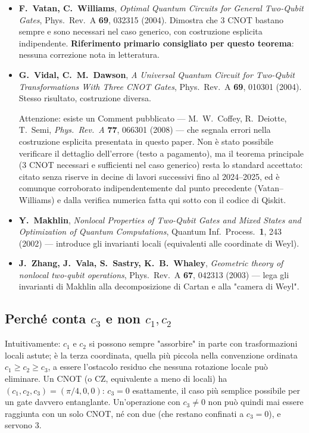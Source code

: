 \documentclass[11pt,a4paper]{article}
\begin{document}
\begin{itemize}[leftmargin=1.3em,itemsep=0.4em]
\item \textbf{F.\ Vatan, C.\ Williams}, \emph{Optimal Quantum Circuits
for General Two-Qubit Gates}, Phys.\ Rev.\ A \textbf{69}, 032315
(2004). Dimostra che 3 CNOT bastano sempre e sono necessari nel caso
generico, con costruzione esplicita indipendente. \textbf{Riferimento
primario consigliato per questo teorema}: nessuna correzione nota in
letteratura.
\item \textbf{G.\ Vidal, C.\ M.\ Dawson}, \emph{A Universal Quantum
Circuit for Two-Qubit Transformations With Three CNOT Gates}, Phys.\
Rev.\ A \textbf{69}, 010301 (2004). Stesso risultato, costruzione
diversa.
\begin{editnote}
Attenzione: esiste un Comment pubblicato --- M.\ W.\ Coffey, R.\
Deiotte, T.\ Semi, \emph{Phys.\ Rev.\ A} \textbf{77}, 066301 (2008) ---
che segnala errori nella costruzione esplicita presentata in questo
paper. Non è stato possibile verificare il dettaglio dell'errore
(testo a pagamento), ma il teorema principale (3 CNOT necessari e
sufficienti nel caso generico) resta lo standard accettato: citato
senza riserve in decine di lavori successivi fino al 2024--2025, ed è
comunque corroborato indipendentemente dal punto precedente
(Vatan--Williams) e dalla verifica numerica fatta qui sotto con il
codice di Qiskit.
\end{editnote}
\item \textbf{Y.\ Makhlin}, \emph{Nonlocal Properties of Two-Qubit
Gates and Mixed States and Optimization of Quantum Computations},
Quantum Inf.\ Process.\ \textbf{1}, 243 (2002) --- introduce gli
invarianti locali (equivalenti alle coordinate di Weyl).
\item \textbf{J.\ Zhang, J.\ Vala, S.\ Sastry, K.\ B.\ Whaley},
\emph{Geometric theory of nonlocal two-qubit operations}, Phys.\ Rev.\
A \textbf{67}, 042313 (2003) --- lega gli invarianti di Makhlin alla
decomposizione di Cartan e alla "camera di Weyl".
\end{itemize}

\subsection*{Perché conta $c_3$ e non $c_1,c_2$}

Intuitivamente: $c_1$ e $c_2$ si possono sempre "assorbire" in parte
con trasformazioni locali astute; è la terza coordinata, quella più
piccola nella convenzione ordinata $c_1\ge c_2\ge c_3$, a essere
l'ostacolo residuo che nessuna rotazione locale può eliminare. Un CNOT
(o CZ, equivalente a meno di locali) ha $(c_1,c_2,c_3)=(\pi/4,0,0)$:
$c_3=0$ esattamente, il caso più semplice possibile per un gate
davvero entanglante. Un'operazione con $c_3\neq0$ non può quindi mai
essere raggiunta con un solo CNOT, né con due (che restano confinati a
$c_3=0$), e servono 3.
\end{document}

